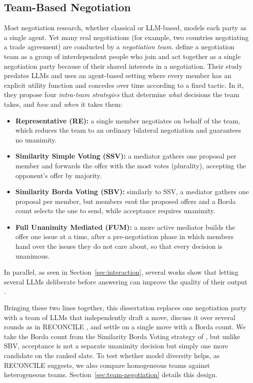 \subsection{Team-Based Negotiation}

Most negotiation research, whether classical or \ac{LLM}-based, models each party as a single agent. Yet many real negotiations (for example, two countries negotiating a trade agreement) are conducted by a \textit{negotiation team}. \textcite{S_nchez_Anguix_2013} define a negotiation team as a group of interdependent people who join and act together as a single negotiation party because of their shared interests in a negotiation. Their study predates \ac{LLM}s and uses an agent-based setting where every member has an explicit utility function and concedes over time according to a fixed tactic. In it, they propose four \textit{intra-team strategies} that determine \textit{what} decisions the team takes, and \textit{how} and \textit{when} it takes them:

\begin{itemize}
    \item \textbf{Representative (RE):} a single member negotiates on behalf of the team, which reduces the team to an ordinary bilateral negotiation and guarantees no unanimity.  
    \item \textbf{Similarity Simple Voting (SSV):} a mediator gathers one proposal per member and forwards the offer with the most votes (plurality), accepting the opponent's offer by majority.
    \item \textbf{Similarity Borda Voting (SBV):} similarly to SSV, a mediator gathers one proposal per member, but members \textit{rank} the proposed offers and a Borda count selects the one to send, while acceptance requires unanimity.
    \item \textbf{Full Unanimity Mediated (FUM):} a more active mediator builds the offer one issue at a time, after a pre-negotiation phase in which members hand over the issues they do not care about, so that every decision is unanimous.
\end{itemize}

In parallel, as seen in Section~\ref{sec:interaction}, several works show that letting several \ac{LLM}s deliberate before answering can improve the quality of their output \parencite{chen2024reconcileroundtableconferenceimproves, 3692070.3692537}. 

Bringing these two lines together, this dissertation replaces one negotiation party with a team of \acp{LLM} that independently draft a move, discuss it over several rounds as in RECONCILE \parencite{chen2024reconcileroundtableconferenceimproves}, and settle on a single move with a Borda count. We take the Borda count from the Similarity Borda Voting strategy of \textcite{S_nchez_Anguix_2013}, but unlike SBV, acceptance is not a separate unanimity decision but simply one more candidate on the ranked slate. To test whether model diversity helps, as RECONCILE suggests, we also compare homogeneous teams against heterogeneous teams. Section~\ref{sec:team-negotiation} details this design.

